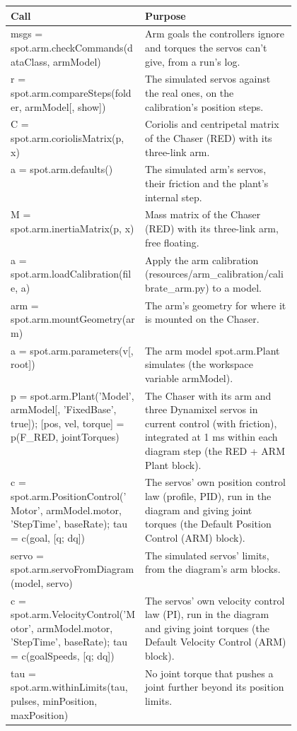 \documentclass[11pt,a4paper]{article}
\begin{document}
\begin{xltabular}{\linewidth}{@{}>{\raggedright\arraybackslash\ttfamily\footnotesize}p{0.47\linewidth} >{\raggedright\arraybackslash\small}X@{}}
\toprule \normalfont\small\textbf{Call} & \textbf{Purpose} \\ \midrule \endhead
msgs = spot.arm.checkCommands(dataClass, armModel) & Arm goals the controllers ignore and torques the servos can't give, from a run's log. \\
r = spot.arm.compareSteps(folder, armModel[, show]) & The simulated servos against the real ones, on the calibration's position steps. \\
C = spot.arm.coriolisMatrix(p, x) & Coriolis and centripetal matrix of the Chaser (RED) with its three-link arm. \\
a = spot.arm.defaults() & The simulated arm's servos, their friction and the plant's internal step. \\
M = spot.arm.inertiaMatrix(p, x) & Mass matrix of the Chaser (RED) with its three-link arm, free floating. \\
a = spot.arm.loadCalibration(file, a) & Apply the arm calibration (resources/arm\_calibration/calibrate\_arm.py) to a model. \\
arm = spot.arm.mountGeometry(arm) & The arm's geometry for where it is mounted on the Chaser. \\
a = spot.arm.parameters(v[, root]) & The arm model spot.arm.Plant simulates (the workspace variable armModel). \\
p = spot.arm.Plant('Model', armModel[, 'FixedBase', true]); [pos, vel, torque] = p(F\_RED, jointTorques) & The Chaser with its arm and three Dynamixel servos in current control (with friction), integrated at 1 ms within each diagram step (the RED + ARM Plant block). \\
c = spot.arm.PositionControl('Motor', armModel.motor, 'StepTime', baseRate); tau = c(goal, [q; dq]) & The servos' own position control law (profile, PID), run in the diagram and giving joint torques (the Default Position Control (ARM) block). \\
servo = spot.arm.servoFromDiagram(model, servo) & The simulated servos' limits, from the diagram's arm blocks. \\
c = spot.arm.VelocityControl('Motor', armModel.motor, 'StepTime', baseRate); tau = c(goalSpeeds, [q; dq]) & The servos' own velocity control law (PI), run in the diagram and giving joint torques (the Default Velocity Control (ARM) block). \\
tau = spot.arm.withinLimits(tau, pulses, minPosition, maxPosition) & No joint torque that pushes a joint further beyond its position limits. \\
\bottomrule\end{xltabular}
\end{document}
